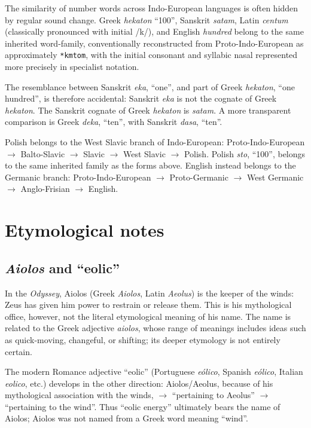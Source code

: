 The similarity of number words across Indo-European languages is often hidden
by regular sound change.  Greek \emph{hekaton} ``100'', Sanskrit \emph{satam},
Latin \emph{centum} (classically pronounced with initial /k/), and English
\emph{hundred} belong to the same inherited word-family, conventionally
reconstructed from Proto-Indo-European as approximately
\texttt{*kmtom}, with the initial consonant and syllabic nasal represented more
precisely in specialist notation.

The resemblance between Sanskrit \emph{eka}, ``one'', and part of Greek
\emph{hekaton}, ``one hundred'', is therefore accidental: Sanskrit
\emph{eka} is not the cognate of Greek \emph{hekaton}.  The Sanskrit cognate
of Greek \emph{hekaton} is \emph{satam}.  A more transparent comparison is
Greek \emph{deka}, ``ten'', with Sanskrit \emph{dasa}, ``ten''.

Polish belongs to the West Slavic branch of Indo-European:
Proto-Indo-European $\to$ Balto-Slavic $\to$ Slavic $\to$ West Slavic
$\to$ Polish.  Polish \emph{sto}, ``100'', belongs to the same inherited
family as the forms above.  English instead belongs to the Germanic branch:
Proto-Indo-European $\to$ Proto-Germanic $\to$ West Germanic $\to$
Anglo-Frisian $\to$ English.


\section{Etymological notes}
\label{section-etymological-notes}

\subsection{\emph{Aiolos} and ``eolic''}
\label{subsection-aiolos-eolic}

In the \emph{Odyssey}, Aiolos (Greek \emph{Aiolos}, Latin \emph{Aeolus}) is
the keeper of the winds: Zeus has given him power to restrain or release
them. This is his mythological office, however, not the literal etymological
meaning of his name. The name is related to the Greek adjective
\emph{aiolos}, whose range of meanings includes ideas such as quick-moving,
changeful, or shifting; its deeper etymology is not entirely certain.

The modern Romance adjective ``eolic'' (Portuguese \emph{eólico}, Spanish
\emph{eólico}, Italian \emph{eolico}, etc.) develops in the other direction:
Aiolos/Aeolus, because of his mythological association with the winds,
$\to$ ``pertaining to Aeolus'' $\to$ ``pertaining to the wind''. Thus
``eolic energy'' ultimately bears the name of Aiolos; Aiolos was not named
from a Greek word meaning ``wind''.

